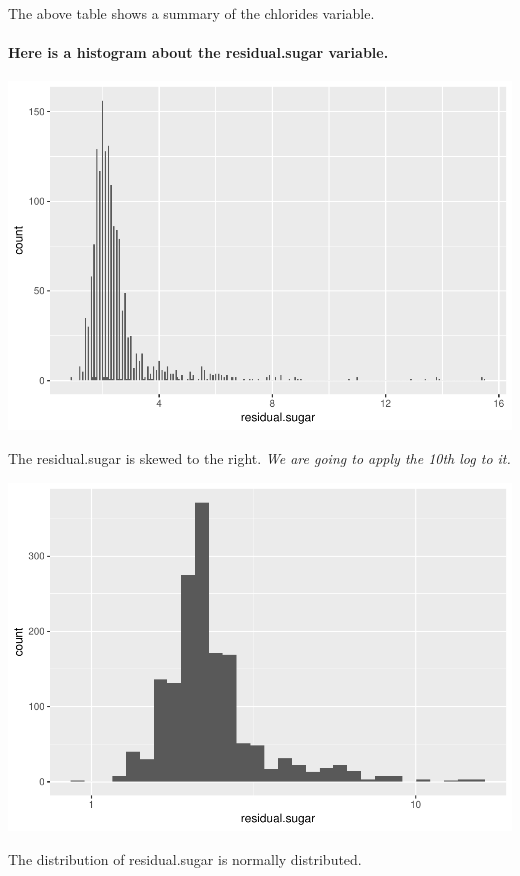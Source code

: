\documentclass[]{article}
\let\oldparagraph\paragraph
\renewcommand{\paragraph}[1]{\oldparagraph{#1}\mbox{}}
\begin{document}
The above table shows a summary of the chlorides variable.

\paragraph{Here is a histogram about the residual.sugar
variable.}\label{here-is-a-histogram-about-the-residual.sugar-variable.}

\includegraphics{RedWine_files/figure-latex/Make_Plot_Function_For_residual.sugar-1.pdf}

The residual.sugar is skewed to the right. \emph{We are going to apply
the 10th log to it.}

\includegraphics{RedWine_files/figure-latex/Make_Plot_Function_For_residual.sugar_log10-1.pdf}

The distribution of residual.sugar is normally distributed.
\end{document}
